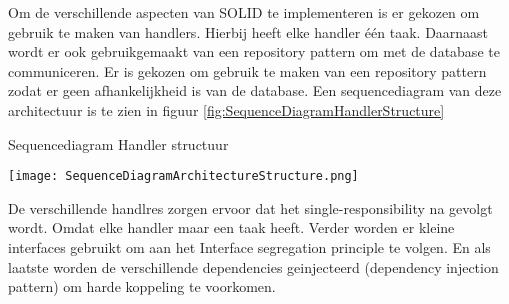 \whitespace
Om de verschillende aspecten van SOLID te implementeren is er gekozen om gebruik te maken van handlers.
Hierbij heeft elke handler één taak.
Daarnaast wordt er ook gebruikgemaakt van een repository pattern om met de database te communiceren.
Er is gekozen om gebruik te maken van een repository pattern zodat er geen afhankelijkheid is van de database.
Een sequencediagram van deze architectuur is te zien in figuur \ref{fig:SequenceDiagramHandlerStructure}

\begin{graphic}
    \captionsetup{type=figure}
    \caption{Sequencediagram Handler structuur}
    \texttt{[image: SequenceDiagramArchitectureStructure.png]}
    \label{fig:SequenceDiagramHandlerStructure}
\end{graphic}

\whitespace
De verschillende handlres zorgen ervoor dat het single-responsibility na gevolgt wordt.
Omdat elke handler maar een taak heeft.
Verder worden er kleine interfaces gebruikt om aan het Interface segregation principle te volgen.
En als laatste worden de verschillende dependencies geinjecteerd (dependency injection pattern) om harde koppeling te voorkomen.
